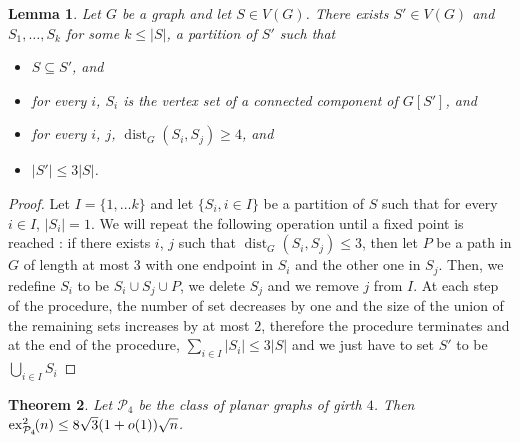 \documentclass{article}
\newtheorem{theorem}{Theorem}
\newtheorem{lemma}[theorem]{Lemma}
\newcommand{\dist}[0]{\operatorname{dist}}
\newcommand{\ex}[3]{\operatorname{ex}^{#1}_{#2}\hspace{-3pt}{#3}}
\begin{document}
\begin{lemma}\label{lemma:connected_dominant_kind_of}
    Let $G$ be a graph and let $S \in V(G)$. There exists $S' \in V(G)$ and $S_1, \dots, S_k$ for some $k \le |S|$, a partition of $S'$ such that
    \begin{itemize}
        \item $S \subseteq S'$, and
        \item for every $i$, $S_i$ is the vertex set of a connected component of $G[S']$, and
        \item for every $i$, $j$, $\dist_G(S_i, S_j) \ge 4$, and
        \item $|S'| \le 3|S|$.
    \end{itemize} 
\end{lemma}

\begin{proof}
    Let $I = \{1, \dots k\}$ and let $\{S_i, i\in I\}$ be a partition of $S$ such that for every $i \in I$, $|S_i| = 1$. We will repeat the following operation until a fixed point is reached : if there exists $i$, $j$ such that $\dist_G(S_i, S_j) \le 3$, then let $P$ be a path in $G$ of length at most $3$ with one endpoint in $S_i$ and the other one in $S_j$. Then, we redefine $S_i$ to be $S_i \cup S_j \cup P$, we delete $S_j$ and we remove $j$ from $I$. At each step of the procedure, the number of set decreases by one and the size of the union of the remaining sets increases by at most $2$, therefore the procedure terminates and at the end of the procedure, $\sum_{i \in I} |S_i| \le 3|S|$ and we just have to set $S'$ to be $\bigcup_{i \in I}S_i$
\end{proof}

\begin{theorem}\label{thm:2_k-colo_planar_girth_4}
    Let $\mathcal{P}_4$ be the class of planar graphs of girth $4$. Then $\ex{2}{\mathcal{P}_4}{(n)} \le 8\sqrt{3}(1 + o(1))\sqrt{n}$.
\end{theorem}
\end{document}
